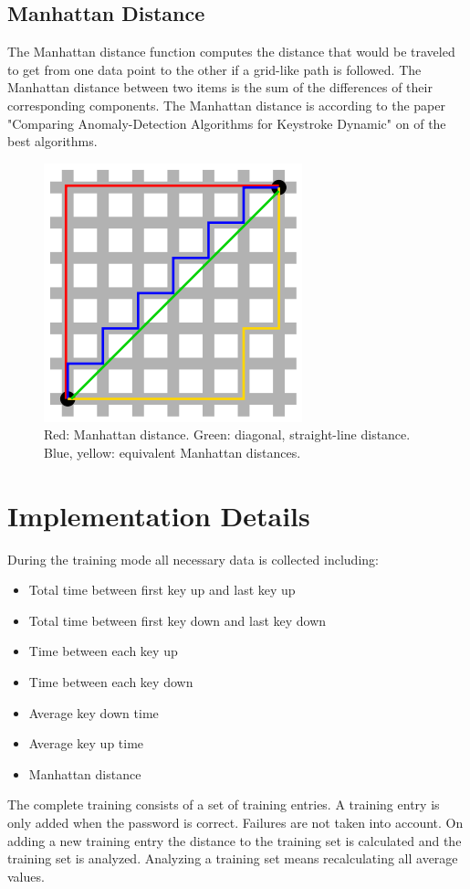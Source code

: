 \documentclass[fleqn,10pt]{SelfArx} %
\begin{document}
\subsection{Manhattan Distance}
The Manhattan distance function computes the distance that would be traveled to get from one data point to the other if a grid-like path is followed. The Manhattan distance between two items is the sum of the differences of their corresponding components\cite{manhattan}.
\newline
The Manhattan distance is according to the paper "Comparing Anomaly-Detection Algorithms for Keystroke Dynamic" \cite{Figueredo:2009dg} on of the best algorithms. 

\begin{figure}[!htb]
\center
\includegraphics[scale=0.75]{manhattan}
 \caption{Red: Manhattan distance. Green: diagonal, straight-line distance. Blue, yellow: equivalent Manhattan distances.\cite{manhattan}}
\end{figure}

\section{Implementation Details}
During the training mode all necessary data is collected including:
\begin{itemize}
  \item Total time between first key up and last key up
  \item Total time between first key down and last key down
  \item Time between each key up
  \item Time between each key down
  \item Average key down time
  \item Average key up time
  \item Manhattan distance
\end{itemize}
The complete training consists of a set of training entries. A training entry is only added when the password is correct. Failures are not taken into account. On adding a new training entry the distance to the training set is calculated and the training set is analyzed. Analyzing a training set means recalculating all average values.
\end{document}
